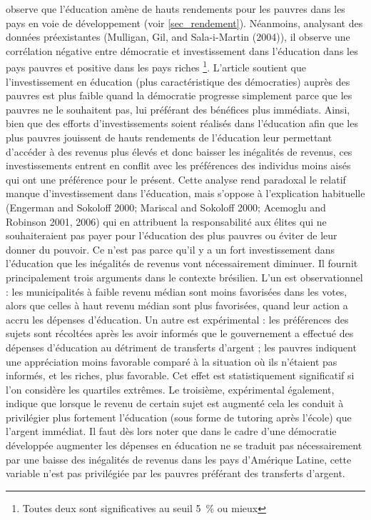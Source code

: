 \documentclass[pagesize, twoside=off, bibliography=totoc, DIV=calc, fontsize=12pt, a4paper, french]{scrartcl}
\begin{document}
 observe que l’éducation amène de hauts rendements pour les pauvres dans les pays en voie de développement (voir \cref{sec_rendement}).
Néanmoins, analysant des données préexistantes (Mulligan, Gil, and Sala-i-Martin (2004)), il observe une corrélation négative entre démocratie et investissement dans l’éducation dans les pays pauvres et positive dans les pays riches \footnote{Toutes deux sont significatives au seuil \SI{5}{\percent} ou mieux}.
L’article soutient que l’investissement en éducation (plus caractéristique des démocraties) auprès des pauvres est plus faible quand la démocratie progresse simplement parce que les pauvres ne le souhaitent pas, lui préférant des bénéfices plus immédiats.
Ainsi, bien que des efforts d’investissements soient réalisés dans l’éducation afin que les plus pauvres jouissent de hauts rendements de l’éducation leur permettant d’accéder à des revenus plus élevés et donc baisser les inégalités de revenus, ces investissements entrent en conflit avec les préférences des individus moins aisés qui ont une préférence pour le présent.
Cette analyse rend paradoxal le relatif manque d’investissement dans l’éducation, mais s’oppose à l’explication habituelle (Engerman and Sokoloff 2000; Mariscal and Sokoloff 2000; Acemoglu and Robinson 2001, 2006) qui en attribuent la responsabilité aux élites qui ne souhaiteraient pas payer pour l’éducation des plus pauvres ou éviter de leur donner du pouvoir.
 Ce n’est pas parce qu’il y a un fort investissement dans l’éducation que les inégalités de revenus vont nécessairement diminuer.
Il fournit principalement trois arguments dans le contexte brésilien.
L’un est observationnel : les municipalités à faible revenu médian sont moins favorisées dans les votes, alors que celles à haut revenu médian sont plus favorisées, quand leur action a accru les dépenses d’éducation.
Un autre est expérimental : les préférences des sujets sont récoltées après les avoir informés que le gouvernement a effectué des dépenses d’éducation au détriment de transferts d’argent ; les pauvres indiquent une appréciation moins favorable comparé à la situation où ils n’étaient pas informés, et les riches, plus favorable.
Cet effet est statistiquement significatif si l’on considère les quartiles extrêmes.
Le troisième, expérimental également, indique que lorsque le revenu de certain sujet est augmenté cela les conduit à privilégier plus fortement l’éducation (sous forme de tutoring après l’école) que l’argent immédiat.
Il faut dès lors noter que dans le cadre d’une démocratie développée augmenter les dépenses en éducation ne se traduit pas nécessairement par une baisse des inégalités de revenus dans les pays d’Amérique Latine, cette variable n'est pas privilégiée par les pauvres préférant des transferts d’argent.
\end{document}
